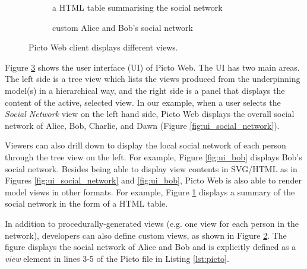 \documentclass[sigconf,review]{acmart}
\begin{document}
\begin{figure}[h]
\begin{subfigure}{0.49\textwidth}
    \caption{a HTML table summarising the social network}
    \label{fig:ui_tabular}
  \end{subfigure}
  \hfill
  \begin{subfigure}{0.49\textwidth}
    \caption{custom Alice and Bob's social network}
    \label{fig:ui_custom}
  \end{subfigure}
  \hfill
  \caption{Picto Web client displays different views.}
  \label{fig:ui}
\end{figure}

Figure \ref{fig:ui} shows the user interface (UI) of Picto Web. The UI has two main areas. The left side is a tree view which lists the views produced from the underpinning model(s) in a hierarchical way, and the right side is a panel that displays the content of the active, selected view. In our example, when a user selects the \emph{Social Network} view on the left hand side, Picto Web displays the overall social network of Alice, Bob, Charlie, and Dawn (Figure \ref{fig:ui_social_network}). 

Viewers can also drill down to display the local social network of each person through the tree view on the left. For example, Figure \ref{fig:ui_bob} displays Bob's social network. Besides being able to display view contents in SVG/HTML as in Figures \ref{fig:ui_social_network} and \ref{fig:ui_bob}, Picto Web is also able to render model views in other formats. For example, Figure \ref{fig:ui_tabular} displays a summary of the social network in the form of a HTML table. 

In addition to procedurally-generated views (e.g. one view for each person in the network), developers can also define custom views, as shown in Figure \ref{fig:ui_custom}. The figure displays the social network of Alice and Bob and is explicitly defined as a \emph{view} element in lines 3-5 of the Picto file in Listing \ref{lst:picto}.
\end{document}
